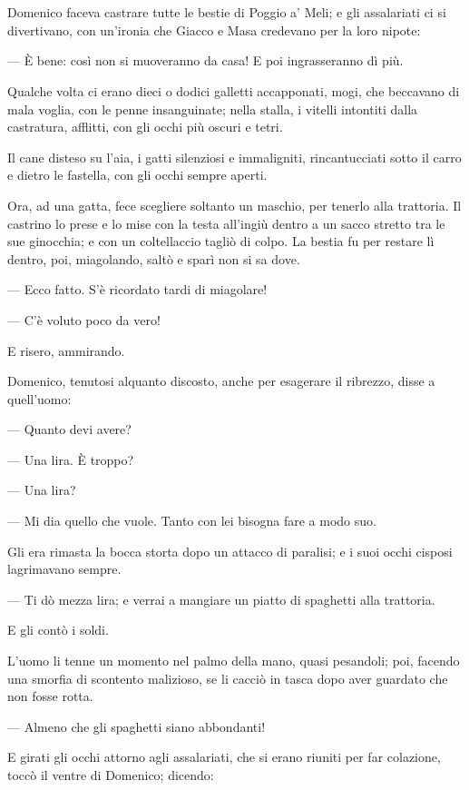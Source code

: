 \chapter{}

Domenico faceva castrare tutte le bestie di Poggio a' Meli; e gli assalariati ci si divertivano, con un'ironia che Giacco e Masa credevano per la loro nipote:

— È bene: così non si muoveranno da casa! E poi ingrasseranno dì più.

Qualche volta ci erano dieci o dodici galletti accapponati, mogi, che beccavano di mala voglia, con le penne insanguinate; nella stalla, i vitelli intontiti dalla castratura, afflitti, con gli occhi più oscuri e tetri.

Il cane disteso su l'aia, i gatti silenziosi e immaligniti, rincantucciati sotto il carro e dietro le fastella, con gli occhi sempre aperti.

Ora, ad una gatta, fece scegliere soltanto un maschio, per tenerlo alla trattoria. Il castrino lo prese e lo mise con la testa all'ingiù dentro a un sacco stretto tra le sue ginocchia; e con un coltellaccio tagliò di colpo. La bestia fu per restare lì dentro, poi, miagolando, saltò e sparì non si sa dove.

— Ecco fatto. S'è ricordato tardi di miagolare!

— C'è voluto poco da vero!

E risero, ammirando.

Domenico, tenutosi alquanto discosto, anche per esagerare il ribrezzo, disse a quell'uomo:

— Quanto devi avere?

— Una lira. È troppo?

— Una lira?

— Mi dia quello che vuole. Tanto con lei bisogna fare a modo suo.

Gli era rimasta la bocca storta dopo un attacco di paralisi; e i suoi occhi cisposi lagrimavano sempre.

— Ti dò mezza lira; e verrai a mangiare un piatto di spaghetti alla trattoria.

E gli contò i soldi.

L'uomo li tenne un momento nel palmo della mano, quasi pesandoli; poi, facendo una smorfia di scontento malizioso, se li cacciò in tasca dopo aver guardato che non fosse rotta.

— Almeno che gli spaghetti siano abbondanti!

E girati gli occhi attorno agli assalariati, che si erano riuniti per far colazione, toccò il ventre di Domenico; dicendo:

